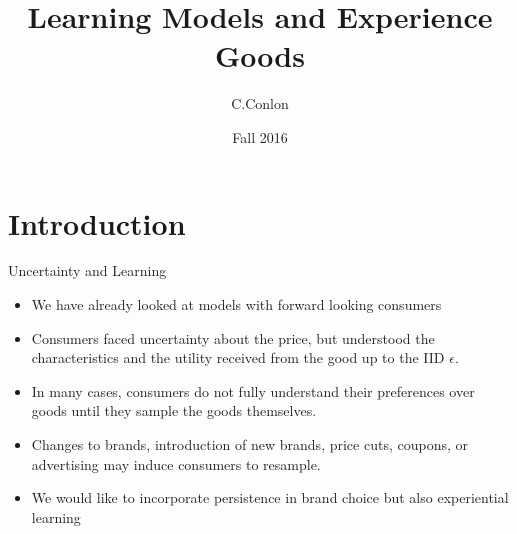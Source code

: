 \documentclass[xcolor=pdftex,dvipsnames,table,mathserif]{beamer}
\title [Dynamic Demand I]{Learning Models and Experience Goods}
\author{C.Conlon}
\institute{Grad IO }
\date{Fall 2016}
\begin{document}
\begin{frame}
\titlepage
\end{frame}



\section*{Introduction}



\begin{frame}{Uncertainty and Learning}
\begin{itemize}
\item We have already looked at models with forward looking consumers
\item Consumers faced uncertainty about the price, but understood the characteristics and the utility received from the good up to the IID $\epsilon$.
\item In many cases, consumers do not fully understand their preferences over goods until they sample the goods themselves.
\item Changes to brands, introduction of new brands, price cuts, coupons, or advertising may induce consumers to resample.
\item We would like to incorporate \alert{persistence} in brand choice but also \alert{experiential learning}
\end{itemize}
\end{frame} 
\end{document}
